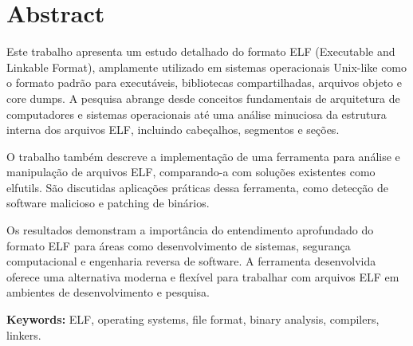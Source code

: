 \chapter*{Abstract}

Este trabalho apresenta um estudo detalhado do formato ELF (Executable and Linkable Format), amplamente utilizado em sistemas operacionais Unix-like como o formato padrão para executáveis, bibliotecas compartilhadas, arquivos objeto e core dumps. A pesquisa abrange desde conceitos fundamentais de arquitetura de computadores e sistemas operacionais até uma análise minuciosa da estrutura interna dos arquivos ELF, incluindo cabeçalhos, segmentos e seções.

O trabalho também descreve a implementação de uma ferramenta para análise e manipulação de arquivos ELF, comparando-a com soluções existentes como elfutils. São discutidas aplicações práticas dessa ferramenta, como detecção de software malicioso e patching de binários.

Os resultados demonstram a importância do entendimento aprofundado do formato ELF para áreas como desenvolvimento de sistemas, segurança computacional e engenharia reversa de software. A ferramenta desenvolvida oferece uma alternativa moderna e flexível para trabalhar com arquivos ELF em ambientes de desenvolvimento e pesquisa.

\vspace{0.5cm}
\noindent
\textbf{Keywords:} ELF, operating systems, file format, binary analysis, compilers, linkers.